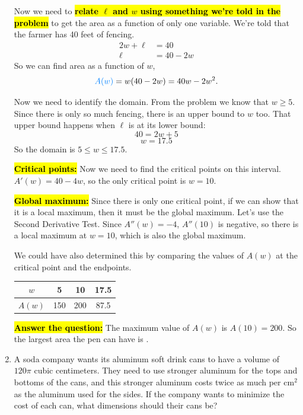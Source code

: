 \documentclass{article}
\newcommand{\highlight}[1]{\boldmath\hl{\textbf{#1}}\unboldmath}
\newcommand{\goal}[1]{\textbf{\textcolor{skyblue}{#1}}}
\begin{document}
\begin{enumerate}
\begin{solution}
      Now we need to \highlight{relate $\ell$ and $w$ using something we're told in
      the problem} to get the area as a function
      of only one variable. We're told that the farmer has 40 feet of fencing.
      \begin{align*}
        2w +\ell &= 40 \\
        \ell &= 40-2w
      \end{align*}
      So we can find area as a function of $w$, 
      \[\goal{$A(w)$} = w (40-2w) = 40w-2w^2.\]
      
      Now we need to identify the domain. From the problem we know that $w \geq 5$.  Since there is only so much fencing, there is an upper bound to $w$ too. That upper bound happens when $\ell$ is at its lower bound:$$40=2w +5$$
      $$w= 17.5$$ 
      So the domain is $5 \leq w \leq 17.5$.

      \highlight{Critical points:} Now we need to find the critical points
      on this interval. $A'(w)=40-4w$, so the only critical point is $w=10$.

      \highlight{Global maximum:} Since there is only one critical point, if we can show
      that it is a local maximum, then it must be the global maximum. Let's use
      the Second Derivative Test. Since $A''(w) = -4$, $A''(10)$ is negative, so
      there is a local maximum at $w=10$, which is also the global maximum.

      We could have also determined
      this by comparing the values of $A(w)$ at the critical point and the
      endpoints.

      \begin{center} 
        \begin{tabular} {c|| c cc}
          $w$ &5 &10 & 17.5\\
          \hline 
          $A(w)$& 150&200&87.5
        \end{tabular} \end{center} 

      \highlight{Answer the question:} The maximum value of $A(w)$ is $A(10)=200$. So
      the largest area the pen can have is .

  \end{solution}

\item 


  \begin{problem}[\vfill\newpage]
    A soda company wants its aluminum soft drink cans to have a volume of $120 \pi$ cubic centimeters. They need to use stronger aluminum for the tops and bottoms of the cans, and this stronger aluminum costs twice as much per cm$^2$ as the aluminum used for the sides. If the company wants to minimize the cost of each can, what dimensions should their cans be?
  \end{problem}


\end{enumerate}
\end{document}

